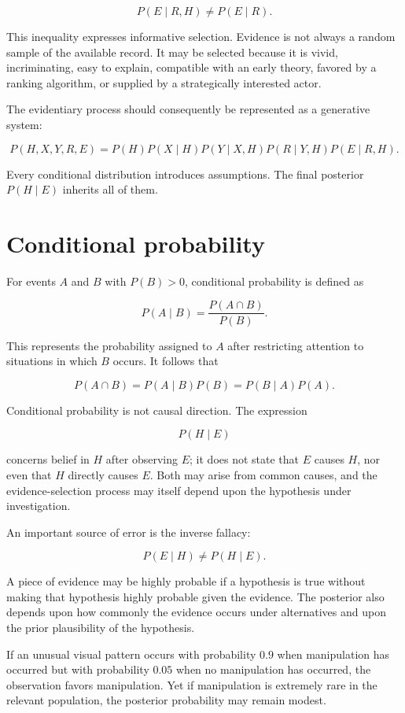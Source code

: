 \[
P(E\mid R,H)\neq P(E\mid R).
\]

This inequality expresses informative selection. Evidence is not always a random sample of the available record. It may be selected because it is vivid, incriminating, easy to explain, compatible with an early theory, favored by a ranking algorithm, or supplied by a strategically interested actor.

The evidentiary process should consequently be represented as a generative system:

\[
P(H,X,Y,R,E)
=
P(H)P(X\mid H)P(Y\mid X,H)P(R\mid Y,H)P(E\mid R,H).
\]

Every conditional distribution introduces assumptions. The final posterior \(P(H\mid E)\) inherits all of them.

\section{Conditional probability}
\label{sec:a4}

For events \(A\) and \(B\) with \(P(B)>0\), conditional probability is defined as

\[
P(A\mid B)
=
\frac{P(A\cap B)}{P(B)}.
\]

This represents the probability assigned to \(A\) after restricting attention to situations in which \(B\) occurs. It follows that

\[
P(A\cap B)
=
P(A\mid B)P(B)
=
P(B\mid A)P(A).
\]

Conditional probability is not causal direction. The expression

\[
P(H\mid E)
\]

concerns belief in \(H\) after observing \(E\); it does not state that \(E\) causes \(H\), nor even that \(H\) directly causes \(E\). Both may arise from common causes, and the evidence-selection process may itself depend upon the hypothesis under investigation.

An important source of error is the inverse fallacy:

\[
P(E\mid H)\neq P(H\mid E).
\]

A piece of evidence may be highly probable if a hypothesis is true without making that hypothesis highly probable given the evidence. The posterior also depends upon how commonly the evidence occurs under alternatives and upon the prior plausibility of the hypothesis.

If an unusual visual pattern occurs with probability \(0.9\) when manipulation has occurred but with probability \(0.05\) when no manipulation has occurred, the observation favors manipulation. Yet if manipulation is extremely rare in the relevant population, the posterior probability may remain modest.

